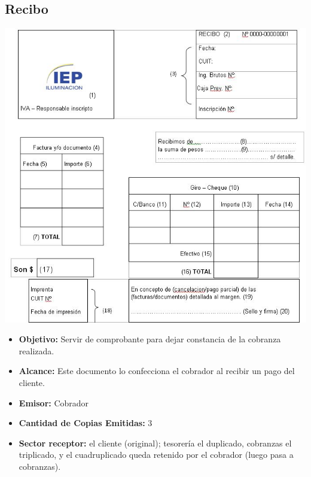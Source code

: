 \subsection{Recibo}
\begin{center}
  \includegraphics[scale=0.6]{./Images/FormulariosIEP/recibo.jpg}
\end{center}

\begin{itemize}
  \item \textbf{Objetivo:} Servir de comprobante para dejar constancia de la cobranza realizada.
  \item \textbf{Alcance:} Este documento lo confecciona el cobrador al recibir un pago del cliente.
  \item \textbf{Emisor:} Cobrador
  \item \textbf{Cantidad de Copias Emitidas:} 3
  \item \textbf{Sector receptor:} el cliente (original); tesorería el duplicado, cobranzas el triplicado, y el cuadruplicado queda retenido por el cobrador (luego pasa a cobranzas).
 \end{itemize}
 
